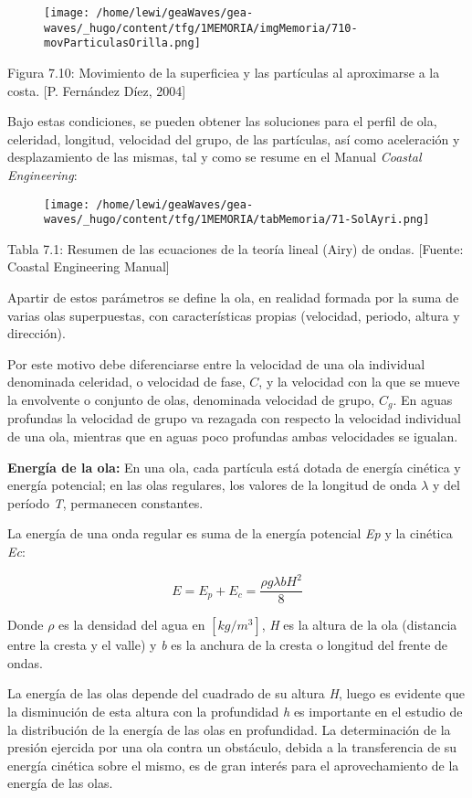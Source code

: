 \begin{figure}
\centering
\texttt{[image: /home/lewi/geaWaves/gea-waves/\_hugo/content/tfg/1MEMORIA/imgMemoria/710-movParticulasOrilla.png]}
\caption{}
\end{figure}

Figura 7.10: Movimiento de la superficiea y las partículas al
aproximarse a la costa. {[}P. Fernández Díez, 2004{]}

Bajo estas condiciones, se pueden obtener las soluciones para el perfil
de ola, celeridad, longitud, velocidad del grupo, de las partículas, así
como aceleración y desplazamiento de las mismas, tal y como se resume en
el Manual \emph{Coastal Engineering}:

\begin{figure}
\centering
\texttt{[image: /home/lewi/geaWaves/gea-waves/\_hugo/content/tfg/1MEMORIA/tabMemoria/71-SolAyri.png]}
\caption{}
\end{figure}

Tabla 7.1: Resumen de las ecuaciones de la teoría lineal (Airy) de
ondas. {[}Fuente: Coastal Engineering Manual{]}

Apartir de estos parámetros se define la ola, en realidad formada por la
suma de varias olas superpuestas, con características propias
(velocidad, periodo, altura y dirección).

Por este motivo debe diferenciarse entre la velocidad de una ola
individual denominada celeridad, o velocidad de fase, \(C\), y la
velocidad con la que se mueve la envolvente o conjunto de olas,
denominada velocidad de grupo, \(C_ g\). En aguas profundas la velocidad
de grupo va rezagada con respecto la velocidad individual de una ola,
mientras que en aguas poco profundas ambas velocidades se igualan.

\textbf{Energía de la ola:} En una ola, cada partícula está dotada de
energía cinética y energía potencial; en las olas regulares, los valores
de la longitud de onda \(\lambda\) y del período \emph{T}, permanecen
constantes.

La energía de una onda regular es suma de la energía potencial \emph{Ep}
y la cinética \emph{Ec}:

\[E=E_p+E_c= \frac {\rho g \lambda b H^2}{8}\]

Donde \(\rho\) es la densidad del agua en \([kg/m^3]\), \emph{H} es la
altura de la ola (distancia entre la cresta y el valle) y \emph{b} es la
anchura de la cresta o longitud del frente de ondas.

La energía de las olas depende del cuadrado de su altura \emph{H}, luego
es evidente que la disminución de esta altura con la profundidad
\emph{h} es importante en el estudio de la distribución de la energía de
las olas en profundidad. La determinación de la presión ejercida por una
ola contra un obstáculo, debida a la transferencia de su energía
cinética sobre el mismo, es de gran interés para el aprovechamiento de
la energía de las olas.

